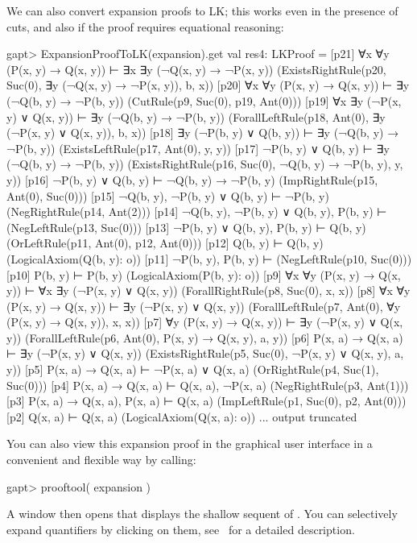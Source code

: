 \documentclass[a4paper,11pt]{book}
\newcommand{\cli}[1]{{\ttfamily {#1}}}
\begin{document}
We can also convert expansion proofs to LK; this works even in the presence of
cuts, and also if the proof requires equational reasoning:
\begin{clilisting}
gapt> ExpansionProofToLK(expansion).get
val res4: LKProof = [p21] ∀x ∀y (P(x, y) → Q(x, y)) ⊢ ∃x ∃y (¬Q(x, y) → ¬P(x, y))    (ExistsRightRule(p20, Suc(0), ∃y (¬Q(x, y) → ¬P(x, y)), b, x))
[p20] ∀x ∀y (P(x, y) → Q(x, y)) ⊢ ∃y (¬Q(b, y) → ¬P(b, y))    (CutRule(p9, Suc(0), p19, Ant(0)))
[p19] ∀x ∃y (¬P(x, y) ∨ Q(x, y)) ⊢ ∃y (¬Q(b, y) → ¬P(b, y))    (ForallLeftRule(p18, Ant(0), ∃y (¬P(x, y) ∨ Q(x, y)), b, x))
[p18] ∃y (¬P(b, y) ∨ Q(b, y)) ⊢ ∃y (¬Q(b, y) → ¬P(b, y))    (ExistsLeftRule(p17, Ant(0), y, y))
[p17] ¬P(b, y) ∨ Q(b, y) ⊢ ∃y (¬Q(b, y) → ¬P(b, y))    (ExistsRightRule(p16, Suc(0), ¬Q(b, y) → ¬P(b, y), y, y))
[p16] ¬P(b, y) ∨ Q(b, y) ⊢ ¬Q(b, y) → ¬P(b, y)    (ImpRightRule(p15, Ant(0), Suc(0)))
[p15] ¬Q(b, y), ¬P(b, y) ∨ Q(b, y) ⊢ ¬P(b, y)    (NegRightRule(p14, Ant(2)))
[p14] ¬Q(b, y), ¬P(b, y) ∨ Q(b, y), P(b, y) ⊢     (NegLeftRule(p13, Suc(0)))
[p13] ¬P(b, y) ∨ Q(b, y), P(b, y) ⊢ Q(b, y)    (OrLeftRule(p11, Ant(0), p12, Ant(0)))
[p12] Q(b, y) ⊢ Q(b, y)    (LogicalAxiom(Q(b, y): o))
[p11] ¬P(b, y), P(b, y) ⊢     (NegLeftRule(p10, Suc(0)))
[p10] P(b, y) ⊢ P(b, y)    (LogicalAxiom(P(b, y): o))
[p9] ∀x ∀y (P(x, y) → Q(x, y)) ⊢ ∀x ∃y (¬P(x, y) ∨ Q(x, y))    (ForallRightRule(p8, Suc(0), x, x))
[p8] ∀x ∀y (P(x, y) → Q(x, y)) ⊢ ∃y (¬P(x, y) ∨ Q(x, y))    (ForallLeftRule(p7, Ant(0), ∀y (P(x, y) → Q(x, y)), x, x))
[p7] ∀y (P(x, y) → Q(x, y)) ⊢ ∃y (¬P(x, y) ∨ Q(x, y))    (ForallLeftRule(p6, Ant(0), P(x, y) → Q(x, y), a, y))
[p6] P(x, a) → Q(x, a) ⊢ ∃y (¬P(x, y) ∨ Q(x, y))    (ExistsRightRule(p5, Suc(0), ¬P(x, y) ∨ Q(x, y), a, y))
[p5] P(x, a) → Q(x, a) ⊢ ¬P(x, a) ∨ Q(x, a)    (OrRightRule(p4, Suc(1), Suc(0)))
[p4] P(x, a) → Q(x, a) ⊢ Q(x, a), ¬P(x, a)    (NegRightRule(p3, Ant(1)))
[p3] P(x, a) → Q(x, a), P(x, a) ⊢ Q(x, a)    (ImpLeftRule(p1, Suc(0), p2, Ant(0)))
[p2] Q(x, a) ⊢ Q(x, a)    (LogicalAxiom(Q(x, a): o))
... output truncated

\end{clilisting}

You can also view this expansion proof in the graphical user interface in
a convenient and flexible way by calling:
\begin{clilisting}
gapt> prooftool( expansion )

\end{clilisting}

A window then opens that displays the shallow sequent of \cli{expansion}.  You
can selectively expand quantifiers by clicking on them,
see~\cite{Hetzl13Understanding} for a detailed description.
\end{document}
